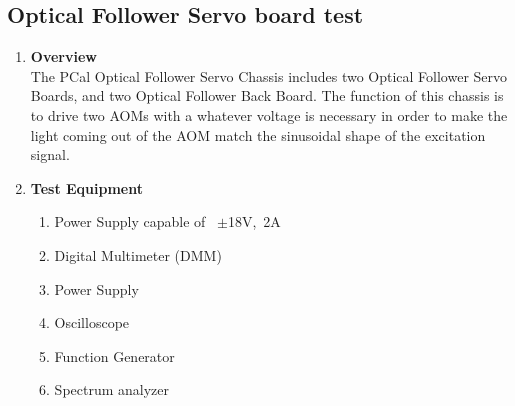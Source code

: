 \subsection{Optical Follower Servo board test}
\begin{enumerate}
	\item \textbf{Overview}\\
	The PCal Optical Follower Servo Chassis includes two Optical Follower Servo Boards, and two Optical Follower Back Board. The function of this chassis is to drive two AOMs with a whatever voltage is necessary in order to make the light coming out of the AOM match the sinusoidal shape of the excitation signal.
	\item \textbf{Test Equipment}
	\begin{enumerate}
		\item Power Supply capable of ~$\pm$18V,~2A
		\item Digital Multimeter (DMM)
		\item Power Supply
		\item Oscilloscope
		\item Function Generator
		\item Spectrum analyzer
	\end{enumerate}
	

\end{enumerate}
